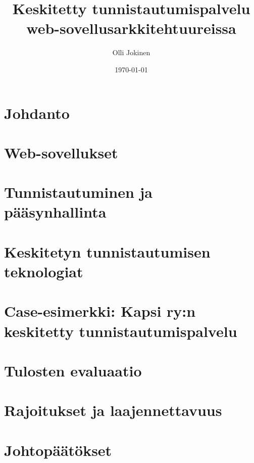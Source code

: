 \documentclass{tktltiki}
\begin{document}
\title{Keskitetty tunnistautumispalvelu web-sovellusarkkitehtuureissa}
\author{Olli Jokinen}
\date{\today}
\maketitle
\doublespacing
{}
\subject{Tietojenkäsittelytiede}
\additionalinformation{}
\begin{abstract}

\end{abstract}
\mytableofcontents
\section{Johdanto}

\section{Web-sovellukset}

\section{Tunnistautuminen ja pääsynhallinta}

\section{Keskitetyn tunnistautumisen teknologiat}

\section{Case-esimerkki: Kapsi ry:n keskitetty tunnistautumispalvelu}

\section{Tulosten evaluaatio}

\section{Rajoitukset ja laajennettavuus}

\section{Johtopäätökset}

\newpage


\lastpage
\end{document}
